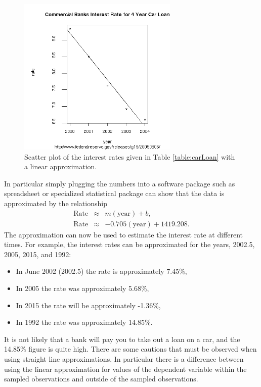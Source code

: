 \documentclass[12pt]{article}
\begin{document}
\begin{figure}[tb]
    \centerline{\includegraphics[width=3in]{bankRatesFit}}
    \caption{Scatter plot of the interest rates given in Table
      \ref{table:carLoan} with a linear approximation.}
  \label{fig:carLoanFit}
\end{figure}

In particular simply plugging the numbers into a software package such
as spreadsheet or specialized statistical package can show that the
data is approximated by the relationship
\begin{eqnarray*}
  \mathrm{Rate} & \approx & m (\mathrm{year}) + b, \\
  \mathrm{Rate} & \approx & -0.705 (\mathrm{year}) + 1419.208.
\end{eqnarray*}
The approximation can now be used to estimate the interest rate at
different times. For example, the interest rates can be approximated
for the years, 2002.5, 2005, 2015, and 1992:
\begin{itemize}
\item In June 2002 (2002.5) the rate is approximately 7.45\%,
\item In 2005 the rate was approximately 5.68\%,
\item In 2015 the rate will be approximately -1.36\%,
\item In 1992 the rate was approximately 14.85\%.
\end{itemize}

It is not likely that a bank will pay you to take out a loan on a car,
and the 14.85\% figure is quite high. There are some cautions that
must be observed when using straight line approximations. In
particular there is a difference between using the linear
approximation for values of the dependent variable within the sampled
observations and outside of the sampled observations. 
\end{document}
